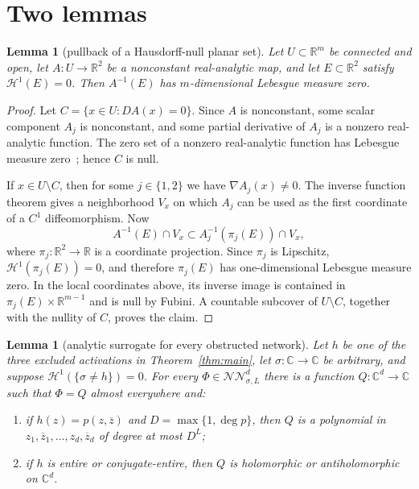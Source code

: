 \documentclass[11pt]{article}
\newtheorem{lemma}[theorem]{Lemma}
\theoremstyle{remark}
\newcommand{\C}{\mathbb C}
\newcommand{\R}{\mathbb R}
\newcommand{\NN}{\mathcal{NN}}
\newcommand{\HH}{\mathcal H}
\begin{document}
\section{Two lemmas}

\begin{lemma}[pullback of a Hausdorff-null planar set]
\label{lem:pullback}
Let $U\subset\R^m$ be connected and open, let
$A:U\to\R^2$ be a nonconstant real-analytic map, and let
$E\subset\R^2$ satisfy $\HH^1(E)=0$.  Then $A^{-1}(E)$ has
$m$-dimensional Lebesgue measure zero.
\end{lemma}

\begin{proof}
Let $C=\{x\in U:DA(x)=0\}$.  Since $A$ is nonconstant, some scalar
component $A_j$ is nonconstant, and some partial derivative of $A_j$ is a
nonzero real-analytic function.  The zero set of a nonzero real-analytic
function has Lebesgue measure zero~\cite{analytic}; hence $C$ is null.

If $x\in U\setminus C$, then for some $j\in\{1,2\}$ we have
$\nabla A_j(x)\ne0$.  The inverse function theorem gives a neighborhood
$V_x$ on which $A_j$ can be used as the first coordinate of a $C^1$
diffeomorphism.  Now
\[
 A^{-1}(E)\cap V_x
 \subset A_j^{-1}(\pi_j(E))\cap V_x,
\]
where $\pi_j:\R^2\to\R$ is a coordinate projection.  Since $\pi_j$ is
Lipschitz, $\HH^1(\pi_j(E))=0$, and therefore $\pi_j(E)$ has one-dimensional
Lebesgue measure zero.  In the local coordinates above, its inverse image is
contained in $\pi_j(E)\times\R^{m-1}$ and is null by Fubini.  A countable
subcover of $U\setminus C$, together with the nullity of $C$, proves the
claim.
\end{proof}

\begin{lemma}[analytic surrogate for every obstructed network]
\label{lem:surrogate}
Let $h$ be one of the three excluded activations in
Theorem~\ref{thm:main}, let $\sigma:\C\to\C$ be arbitrary, and suppose
$\HH^1(\{\sigma\ne h\})=0$.  For every
$\Phi\in\NN^d_{\sigma,L}$ there is a function $Q:\C^d\to\C$ such that
$\Phi=Q$ almost everywhere and:
\begin{enumerate}[label=(\alph*),leftmargin=2em]
\item if $h(z)=p(z,\overline z)$ and
      $D=\max\{1,\deg p\}$, then $Q$ is a polynomial in
      $z_1,\overline z_1,\ldots,z_d,\overline z_d$ of degree at most $D^L$;
\item if $h$ is entire or conjugate-entire, then $Q$ is holomorphic or
      antiholomorphic on $\C^d$.
\end{enumerate}
\end{lemma}
\end{document}
